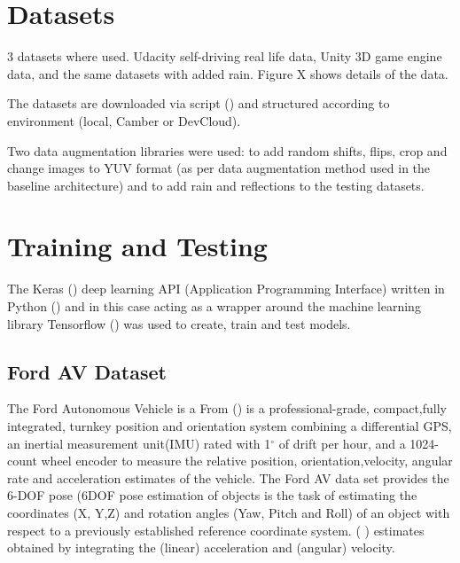 \section{Datasets}
3 datasets where used. Udacity self-driving real life data, Unity 3D game engine data, and the same datasets with added rain. Figure X shows details of the data.

The datasets are downloaded via script (\cite{Sikar2020}) and structured according to environment (local, Camber or DevCloud).

Two data augmentation libraries were used: \cite{Naoki2016} to add random shifts, flips, crop and change images to YUV format (as per \cite{bojarski2016end} data augmentation method used in the baseline architecture) and \cite{Saxena2017} to add rain and reflections to the testing datasets.

\section{Training and Testing}

The Keras (\cite{chollet2015keras}) deep learning API (Application Programming Interface) written in Python (\cite{van1995python}) and in this case acting as a wrapper around the machine learning library Tensorflow (\cite{abadi2016tensorflow})  was used to create, train and test models.

\subsection{Ford AV Dataset}
The Ford Autonomous Vehicle is a 
From %
 (\cite{Applanix}) is a professional-grade, compact,fully  integrated,  turnkey  position  and  orientation  system combining a differential GPS, an inertial measurement unit(IMU)  rated  with  1$^{\circ}$ of  drift  per  hour,  and  a  1024-count wheel encoder to measure the relative position, orientation,velocity,  angular  rate  and  acceleration  estimates  of  the vehicle. The Ford AV data set provides the 6-DOF pose (6DOF pose estimation of objects is the task of estimating the coordinates (X, Y,Z) and rotation angles (Yaw, Pitch and Roll) of an object with respect to a previously established reference coordinate system. (\cite{7005077} ) estimates obtained by integrating the (linear) acceleration and (angular) velocity.

